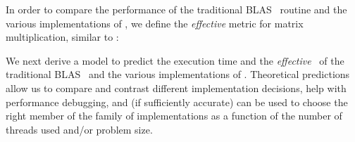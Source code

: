


In order to compare the performance of the traditional BLAS \dgemm\ routine and the various implementations of
\strassen, we define the \emph{effective} \GFLOPS{} metric for
 matrix multiplication, similar to \cite{StrassenBenson,PPL2,StrassenLipshitz}:

We next derive a model to predict the execution time  and the \emph{effective} \GFLOPS\ of the traditional
BLAS \dgemm\ and the various implementations of \strassen.  
Theoretical predictions allow us to compare and contrast different implementation decisions, help with 
performance debugging, and (if sufficiently accurate) can be used to 
choose the right member of the family of implementations as a function of the number of threads used and/or problem size.





